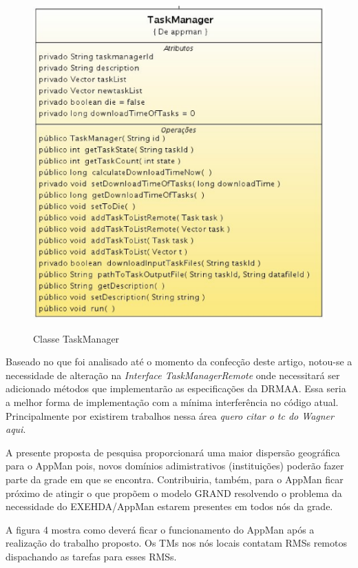 \begin{figure}[h]
\center
\includegraphics[scale=.4]{img/TaskManager.eps}
\label{TaskManager}
\caption{Classe TaskManager}
\end{figure}

Baseado no que foi analisado até o momento da confecção deste artigo, notou-se a necessidade de alteração na {\it Interface TaskManagerRemote} onde necessitará ser adicionado métodos que implementarão as especificações da DRMAA. Essa seria a melhor forma de implementação com a mínima interferência no código atual. Principalmente por existirem trabalhos nessa área {\it quero citar o tc do Wagner aqui}.

A presente proposta de pesquisa proporcionará uma maior dispersão geográfica para o AppMan pois, novos domínios adimistrativos (instituições) poderão fazer parte da grade em que se encontra. Contribuiria, também, para o AppMan ficar próximo de atingir o que propõem o modelo GRAND resolvendo o problema da necessidade do EXEHDA/AppMan estarem presentes em todos nós da grade. 

A figura 4 mostra como deverá ficar o funcionamento do AppMan após a realização do trabalho proposto. Os TMs nos nós locais contatam RMSs remotos dispachando as tarefas para esses RMSs.

